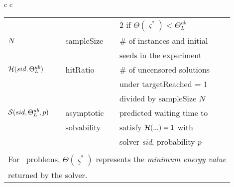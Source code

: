 \begin{table*}[t]
\begin{tabular}[]{c c}
\begin{tabular}[t]{ l l l}
~~                 & ~~         & 2 if $\Theta({\underline \varsigma}^*) < \Theta^{ub}_L$\\[0.5ex]
$N$                & sampleSize & \# of instances and initial  \\[-0.2ex]
~~                 &            & seeds in the experiment \\[0.55ex]  
${\cal H}(sid,\Theta_{L}^{ub})$   & hitRatio     & \# of uncensored solutions\\[-0.35ex]
~~                                & ~~           & under targetReached = 1\\[-0.35ex] 
~~                                & ~~           & divided by sampleSize $N$  \\[0.35ex]  
${\cal S}(sid,\Theta_{L}^{ub},p)$ & asymptotic   & predicted waiting time to\\[-0.35ex]
~~                                & solvability  & satisfy ${\cal H}(...)=1$ with  \\ [-0.35ex]
~~                                & ~~           & solver {\em sid}, probability $p$ \\[0.50ex]
\hline
\multicolumn{3}{l}{ }  \\[-1.0ex]
\multicolumn{3}{l}{For \labs\ problems, $\Theta({\underline \varsigma}^*)$ represents the {\em minimum energy value}} \\
\multicolumn{3}{l}{returned by the solver. }  
\end{tabular}
\end{tabular}
\vspace*{-2ex}
\end{table*}
